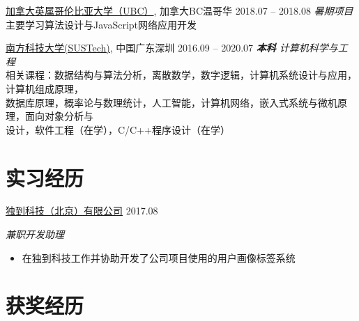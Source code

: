 \documentclass[hidelinks__VERSION__]{adamyi-cv}
\begin{document}
\begin{entrylist}


\entry
{\href{https://www.ubc.ca/}{\heir 加拿大英属哥伦比亚大学（UBC）}, \hei 加拿大BC温哥华}
{2018.07 -- 2018.08}
{\hei \emph{暑期项目}\\
主要学习算法设计与JavaScript网络应用开发
}

\entry
{\href{https://www.sustech.edu.cn/}{\heir 南方科技大学(SUSTech)}, \hei 中国广东深圳}
{2016.09 -- 2020.07}
{\hei \emph{\textbf{\hei 本科} 计算机科学与工程}\\
相关课程：数据结构与算法分析，离散数学，数字逻辑，计算机系统设计与应用，计算机组成原理，\\
数据库原理，概率论与数理统计，人工智能，计算机网络，嵌入式系统与微机原理，面向对象分析与\\
设计，软件工程（在学），C/C++程序设计（在学）
}

\end{entrylist}


\section{\heir 实习\heir 经历}

\begin{entrylist}


\entry
{\href{http://www.doodod.com/}{\heir 独到科技（北京）有限公司}}
{2017.08}
{\emph{\hei 兼职开发助理}
\begin{itemize}
\item {\hei 在独到科技工作并协助开发了公司项目使用的用户画像标签系统}
\end{itemize}}


\end{entrylist}


\section{\heir 获奖\heir 经历}
\end{document}
